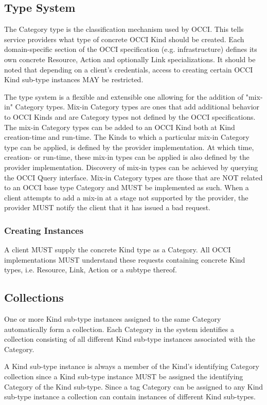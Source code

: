 \documentclass[10pt,a4paper,british]{article}
\begin{document}
\subsection{Type System}
\label{sec:type_system}
The Category type is the classification mechanism used by OCCI. This
tells service providers what type of concrete OCCI Kind should be
created. Each domain-specific section of the OCCI specification
(e.g. infrastructure) defines its own concrete Resource, Action and
optionally Link specializations. It should be noted that depending on
a client's credentials, access to creating certain OCCI Kind sub-type instances
MAY be restricted.

The type system is a flexible and extensible one allowing for the
addition of "mix-in" Category types. Mix-in Category types are ones
that add additional behavior to OCCI Kinds and are Category types not
defined by the OCCI specifications. The mix-in Category types can be
added to an OCCI Kind both at Kind creation-time and run-time. The
Kinds to which a particular mix-in Category type can be applied, is
defined by the provider implementation. At which time, creation- or
run-time, these mix-in types can be applied is also defined by the
provider implementation. Discovery of mix-in types can be achieved by
querying the OCCI Query interface. Mix-in Category types are those
that are NOT related to an OCCI base type Category and MUST be
implemented as such. When a client attempts to add a mix-in at a stage
not supported by the provider, the provider MUST notify the client
that it has issued a bad request.

\subsubsection{Creating Instances}
A client MUST supply the concrete Kind type as a Category. All OCCI
implementations MUST understand these requests containing concrete
Kind types, i.e. Resource, Link, Action or a subtype thereof.

\subsection{Collections}
\label{sec:collection}
One or more Kind sub-type instances assigned to the same Category
automatically form a collection. Each Category in the system
identifies a collection consisting of all different Kind sub-type instances
associated with the Category.

A Kind sub-type instance is always a member of the Kind's identifying
Category collection since a Kind sub-type instance MUST be assigned the
identifying Category of the Kind sub-type.
Since a tag Category can be assigned to any Kind sub-type
instance a collection can contain instances of different Kind
sub-types.
\end{document}
